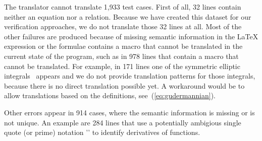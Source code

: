The translator cannot translate 1,933 test cases. First of all, 32 lines contain neither an equation nor a relation. Because we have created this dataset for our verification approaches, we do not translate those 32 lines at all. Most of the other failures are produced because of missing semantic information in the \LaTeX{} expression or the formulae contains a macro that cannot be translated in the current state of the program, such as in 978 lines that contain a macro that cannot be translated. For example, in 171 lines one of the symmetric elliptic integrals~\parencite[(19.16.1-6)]{NIST:DLMF} appears and we do not provide translation patterns for those integrals, because there is no direct translation possible yet. A workaround would be to allow translations based on the definitions, see~(\ref{eq:gudermannian}).

Other errors appear in 914 cases, where the semantic information is missing or is not unique. An example are 284 lines that use a potentially ambigious single quote (or prime) notation '\aSingleQuote' to identify derivatives of functions. 

\cleardoublepage